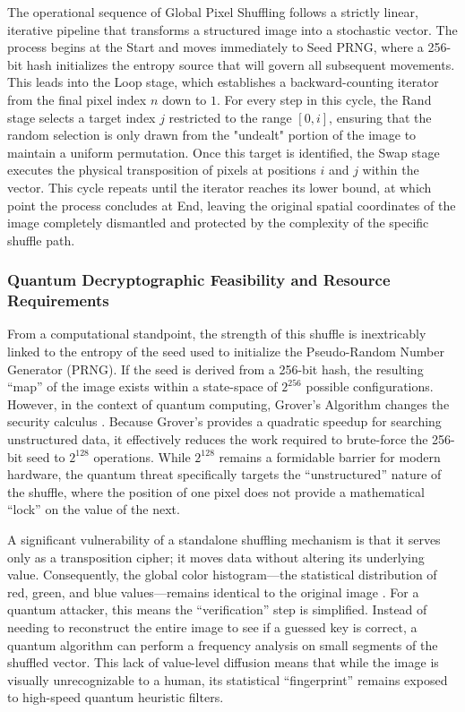 \documentclass[12pt,fleqn]{article}
\begin{document}
The operational sequence of Global Pixel Shuffling follows a strictly linear, iterative pipeline that transforms a structured image into a stochastic vector. The process begins at the Start and moves immediately to Seed PRNG, where a 256-bit hash initializes the entropy source that will govern all subsequent movements. This leads into the Loop stage, which establishes a backward-counting iterator from the final pixel index $n$ down to $1$. For every step in this cycle, the Rand stage selects a target index $j$ restricted to the range $[0, i]$, ensuring that the random selection is only drawn from the "undealt" portion of the image to maintain a uniform permutation. Once this target is identified, the Swap stage executes the physical transposition of pixels at positions $i$ and $j$ within the vector. This cycle repeats until the iterator reaches its lower bound, at which point the process concludes at End, leaving the original spatial coordinates of the image completely dismantled and protected by the complexity of the specific shuffle path.

\subsubsection{Quantum Decryptographic Feasibility and Resource Requirements}

From a computational standpoint, the strength of this shuffle is inextricably linked to the entropy of the seed used to initialize the Pseudo-Random Number Generator (PRNG). If the seed is derived from a 256-bit hash, the resulting ``map'' of the image exists within a state-space of $2^{256}$ possible configurations. However, in the context of quantum computing, Grover's Algorithm changes the security calculus \cite{grover1996fast}. Because Grover's provides a quadratic speedup for searching unstructured data, it effectively reduces the work required to brute-force the 256-bit seed to $2^{128}$ operations. While $2^{128}$ remains a formidable barrier for modern hardware, the quantum threat specifically targets the ``unstructured'' nature of the shuffle, where the position of one pixel does not provide a mathematical ``lock'' on the value of the next.

A significant vulnerability of a standalone shuffling mechanism is that it serves only as a transposition cipher; it moves data without altering its underlying value. Consequently, the global color histogram---the statistical distribution of red, green, and blue values---remains identical to the original image \cite{shannon1949communication}. For a quantum attacker, this means the ``verification'' step is simplified. Instead of needing to reconstruct the entire image to see if a guessed key is correct, a quantum algorithm can perform a frequency analysis on small segments of the shuffled vector. This lack of value-level diffusion means that while the image is visually unrecognizable to a human, its statistical ``fingerprint'' remains exposed to high-speed quantum heuristic filters.
\end{document}
